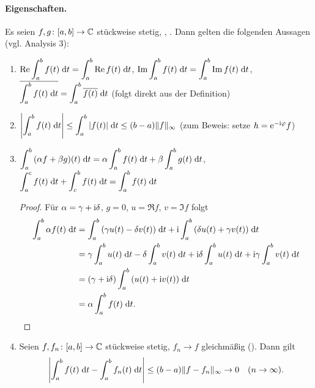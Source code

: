 \documentclass[a4paper,twoside,DIV15,BCOR12mm]{scrbook}
\begin{document}
\paragraph{Eigenschaften.} Es seien $f,g\colon[a,b]\to\mathbb{C}$ stückweise stetig, , \kmplx{\alpha,\beta}. Dann gelten die folgenden Aussagen (vgl. Analysis 3):
\begin{enumerate}
\item $\displaystyle \operatorname{Re}{\int_{a}^{b}{f(t)}\;\mathrm{d}t} = \int_{a}^{b}{\operatorname{Re}{f(t)}}\;\mathrm{d}t$, $\displaystyle \operatorname{Im}{\int_{a}^{b}{f(t)}\;\mathrm{d}t} = \int_{a}^{b}{\operatorname{Im}{f(t)}}\;\mathrm{d}t$, 
$\displaystyle \overline{\int_{a}^{b}{f(t)}\;\mathrm{d}t} = \int_{a}^{b}{\overline{f(t)}}\;\mathrm{d}t$ (folgt direkt aus der Definition)
\item $\displaystyle \left\lvert\int_{a}^{b}{f(t)}\;\mathrm{d}t\right\lvert \le \int_{a}^{b}{\left\lvert f(t)\right\lvert}\;\mathrm{d}t \le (b-a) \|f\|_\infty$ (zum Beweis: setze $h=\mathrm{e}^{-\mathrm{i}\varphi}f$)
\item $\displaystyle \int_{a}^{b}{(\alpha f + \beta g)(t)}\;\mathrm{d}t = \alpha \int_{a}^{b}{f(t)}\;\mathrm{d}t + \beta \int_{a}^{b}{g(t)}\;\mathrm{d}t$,
$\displaystyle \int_{a}^{c}{f(t)}\;\mathrm{d}t + \int_{c}^{b}{f(t)}\;\mathrm{d}t = \int_{a}^{b}{f(t)}\;\mathrm{d}t$
\begin{proof}
Für $\alpha = \gamma + \mathrm{i}\delta$, $g=0$, $u=\Re{f}$, $v=\Im{f}$ folgt
\begin{align*}
\int_{a}^{b}{\alpha f(t)}\;\mathrm{d}t &= \int_{a}^{b}{(\gamma u(t) - \delta v(t))}\;\mathrm{d}t + \mathrm{i} \int_{a}^{b}{(\delta u(t) + \gamma v(t))}\;\mathrm{d}t\\
&= \gamma \int_{a}^{b}{u(t)}\;\mathrm{d}t - \delta \int_{a}^{b}{v(t)}\;\mathrm{d}t + \mathrm{i}\delta \int_{a}^{b}{u(t)}\;\mathrm{d}t + \mathrm{i}\gamma \int_{a}^{b}{v(t)}\;\mathrm{d}t\\
&= (\gamma+\mathrm{i}\delta) \int_{a}^{b}{(u(t)+\mathrm{i} v(t))}\;\mathrm{d}t\\
&= \alpha \int_{a}^{b}{f(t)}\;\mathrm{d}t.
\end{align*}
\end{proof}
\item Seien $f,f_n\colon[a,b]\to\mathbb{C}$ stückweise stetig, $f_n\to f$ gleichmäßig (\ninf). Dann gilt
\[\left\lvert\int_{a}^{b}{f(t)}\;\mathrm{d}t-\int_{a}^{b}{f_n(t)}\;\mathrm{d}t\right\lvert \le (b-a) \|f-f_n\|_\infty \to 0 \quad (n\rightarrow\infty).\]
\end{enumerate}
\end{document}
